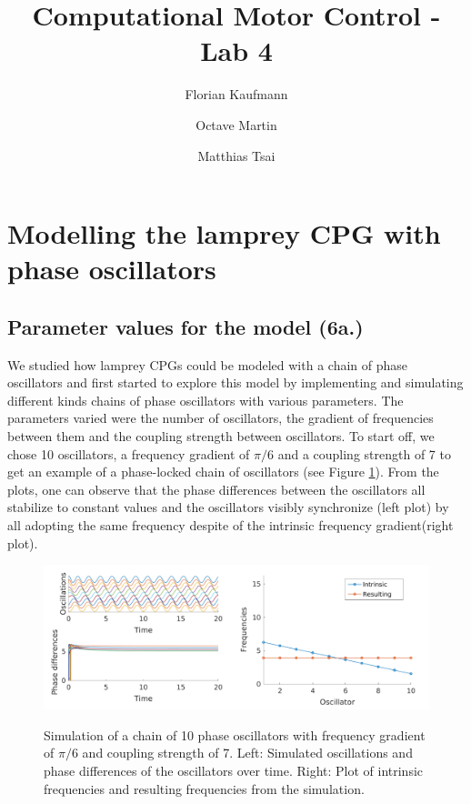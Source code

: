 \documentclass[a4paper]{scrartcl}
\title{Computational Motor Control - Lab 4}
\author{Florian Kaufmann \and Octave Martin \and Matthias Tsai}
\begin{document}
\maketitle

\section{Modelling the lamprey CPG with phase oscillators}
\subsection{Parameter values for the model (6a.)}

We studied how lamprey CPGs could be modeled with a chain of phase oscillators and first started to explore this model by implementing and simulating different kinds chains of phase oscillators with various parameters. The parameters varied were the number of oscillators, the gradient of frequencies between them and the coupling strength between oscillators. To start off, we chose 10 oscillators, a frequency gradient of $\pi /6$ and a coupling strength of 7 to get an example of a phase-locked chain of oscillators (see Figure \ref{fig:f6a-standard}). From the plots, one can observe that the phase differences between the oscillators all stabilize to constant values and the oscillators visibly synchronize (left plot) by all adopting the same frequency despite of the intrinsic frequency gradient(right plot).

\begin{figure}[!b]
	\centering
	\includegraphics[width=0.5\textwidth]{fig/chain_phase_oscil-6a_stable.png}\includegraphics[width=0.5\textwidth]{fig/chain_phase_oscil_freq-6a_stable.png}
	\caption{Simulation of a chain of 10 phase oscillators with frequency gradient of $\pi /6$ and coupling strength of 7. Left: Simulated oscillations and phase differences of the oscillators over time.  Right: Plot of intrinsic frequencies and resulting frequencies from the simulation.}
	\label{fig:f6a-standard}
\end{figure}
\end{document}
